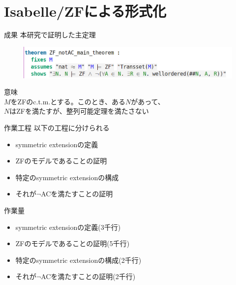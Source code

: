 \documentclass[17pt,aspectratio=169]{beamer}
\begin{document}
\section {Isabelle/ZFによる形式化}

\begin{frame}{成果}
    本研究で証明した主定理
    \vspace{-1cm}
    \hspace{-1.5cm}
    \begin{figure}
        \includegraphics[width=1.1\linewidth]{./images/ZF_notAC_main_theorem.png}
    \end{figure}

    \vspace{-5pt}
    意味 \\
    {\small
    \hspace{1cm} $M$をZFのc.t.m.とする。このとき、ある$N$があって、\\
    \hspace{1cm} $N$はZFを満たすが、整列可能定理を満たさない
    }
\end{frame}

\begin{frame}{作業工程}
    以下の工程に分けられる
    {\small
    \begin{itemize}[itemsep=8pt]
        \item symmetric extensionの定義
        \item ZFのモデルであることの証明
        \item 特定のsymmetric extensionの構成
        \item それが$\neg$ACを満たすことの証明
    \end{itemize} }
\end{frame}

\begin{frame}{作業量}
    {\small
        \begin{itemize}[itemsep=8pt]
            \item symmetric extensionの定義(3千行)
            \item ZFのモデルであることの証明(5千行)
            \item 特定のsymmetric extensionの構成(2千行)
            \item それが$\neg$ACを満たすことの証明(2千行)
        \end{itemize} }
\end{frame}
\end{document}
